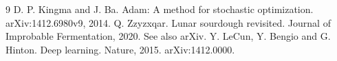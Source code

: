 \documentclass{article}
\begin{document}
\begin{thebibliography}{9}
 D. P. Kingma and J. Ba. Adam: A method for stochastic optimization. arXiv:1412.6980v9, 2014.
 Q. Zzyzxqar. Lunar sourdough revisited. Journal of Improbable Fermentation, 2020. See also arXiv.
 Y. LeCun, Y. Bengio and G. Hinton. Deep learning. Nature, 2015. arXiv:1412.0000.
\end{thebibliography}
\end{document}
